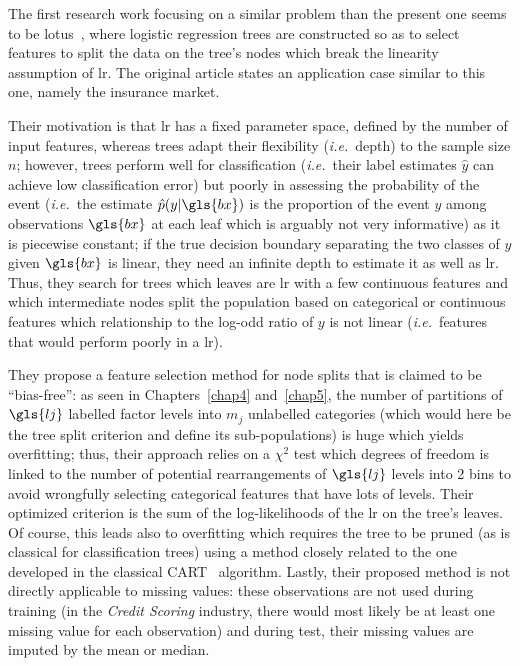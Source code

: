 The first research work focusing on a similar problem than the present one seems to be \gls{lotus}~\cite{chan2004lotus}, where logistic regression trees are constructed so as to select features to split the data on the tree's nodes which break the linearity assumption of \gls{lr}. The original article states an application case similar to this one, namely the insurance market.

Their motivation is that \gls{lr} has a fixed parameter space, defined by the number of input features, whereas trees adapt their flexibility (\textit{i.e.}\ depth) to the sample size $n$; however, trees perform well for classification (\textit{i.e.}\ their label estimates $\hat{y}$ can achieve low classification error) but poorly in assessing the probability of the event (\textit{i.e.}\ the estimate $\hat{p}(y | \gls{bx})$ is the proportion of the event $y$ among observations $\gls{bx}$ at each leaf which is arguably not very informative) as it is piecewise constant; if the true decision boundary separating the two classes of $y$ given $\gls{bx}$ is linear, they need an infinite depth to estimate it as well as \gls{lr}. Thus, they search for trees which leaves are \gls{lr} with a few continuous features and which intermediate nodes split the population based on categorical or continuous features which relationship to the log-odd ratio of $y$ is not linear (\textit{i.e.}\ features that would perform poorly in a \gls{lr}).

They propose a feature selection method for node splits that is claimed to be ``bias-free'': as seen in Chapters~\ref{chap4} and~\ref{chap5}, the number of partitions of $\gls{lj}$ labelled factor levels into $m_j$ unlabelled categories (which would here be the tree split criterion and define its sub-populations) is huge which yields overfitting; thus, their approach relies on a $\chi^2$ test which degrees of freedom is linked to the number of potential rearrangements of $\gls{lj}$ levels into 2 bins to avoid wrongfully selecting categorical features that have lots of levels. Their optimized criterion is the sum of the log-likelihoods of the \gls{lr} on the tree's leaves. Of course, this leads also to overfitting which requires the tree to be pruned (as is classical for classification trees) using a method closely related to the one developed in the classical CART~\cite{cart84} algorithm. Lastly, their proposed method is not directly applicable to missing values: these observations are not used during training (in the \textit{Credit Scoring} industry, there would most likely be at least one missing value for each observation) and during test, their missing values are imputed by the mean or median.

